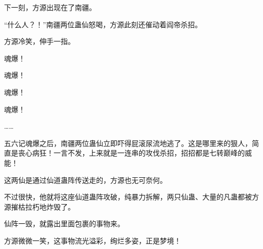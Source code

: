 \begin{this_body}
下一刻，方源出现在了南疆。

“什么人？！”南疆两位蛊仙怒喝，方源此刻还催动着阎帝杀招。

方源冷笑，伸手一指。

魂爆！

魂爆！

魂爆！

魂爆！

……

五六记魂爆之后，南疆两位蛊仙立即吓得屁滚尿流地逃了。这是哪里来的狠人，简直是丧心病狂！一言不发，上来就是一连串的攻伐杀招，招招都是七转巅峰的威能！

这两仙是通过仙道蛊阵传送走的，方源也无可奈何。

不过很快，他就将这座仙道蛊阵攻破，纯暴力拆解，两只仙蛊、大量的凡蛊都被方源摧枯拉朽地炸毁了。

仙阵一毁，就露出里面包裹的事物来。

方源微微一笑，这事物流光溢彩，绚烂多姿，正是梦境！

\end{this_body}

